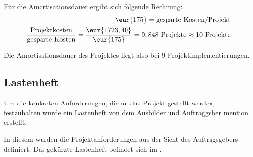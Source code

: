 Für die Amortisationsdauer ergibt sich folgende Rechnung:\begin{eqnarray}
\eur{175} = \mbox{gesparte Kosten/Projekt}\\
\frac{\mbox{Projektkosten}}{\mbox{gesparte Kosten}} = 
\frac{\eur{1723,40}}{\eur{175}}
= 9,848\mbox{ Projekte} \approx 10\mbox{ Projekte}
\end{eqnarray}
\setcounter{equation}{0}

Die Amortisationsdauer des Projektes liegt also bei 9
Projektimplementierungen.\\

\subsection{Lastenheft}
\label{sec:Lastenheft}
Um die konkreten Anforderungen, die an das Projekt gestellt werden, festzuhalten
wurde ein Lastenheft von dem Ausbilder und Auftraggeber \ac{mention} erstellt.

In diesem wurden die Projektanforderungen aus der Sicht des Auftragsgebers
definiert. Das gekürzte Lastenheft befindet sich im .
